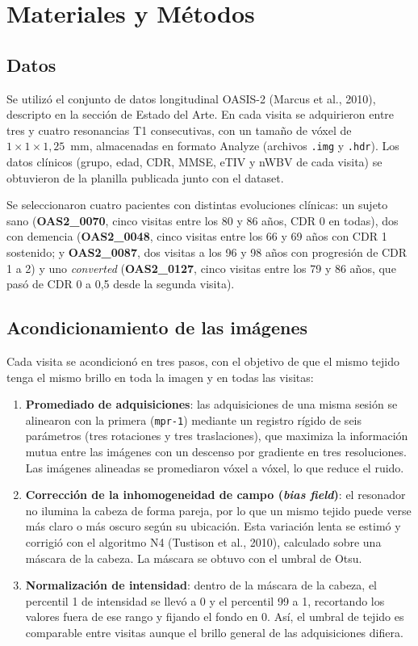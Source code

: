 \documentclass[10pt]{article}
\begin{document}
\section{Materiales y Métodos}
\subsection{Datos}
 
Se utilizó el conjunto de datos longitudinal OASIS-2 (Marcus et al., 2010), descripto en la sección de Estado del Arte. En cada visita se adquirieron entre tres y cuatro resonancias T1 consecutivas, con un tamaño de vóxel de $1 \times 1 \times 1{,}25$~mm, almacenadas en formato Analyze (archivos \texttt{.img} y \texttt{.hdr}). Los datos clínicos (grupo, edad, CDR, MMSE, eTIV y nWBV de cada visita) se obtuvieron de la planilla publicada junto con el dataset.
 
Se seleccionaron cuatro pacientes con distintas evoluciones clínicas: un sujeto sano (\textbf{OAS2\_0070}, cinco visitas entre los 80 y 86 años, CDR 0 en todas), dos con demencia (\textbf{OAS2\_0048}, cinco visitas entre los 66 y 69 años con CDR 1 sostenido; y \textbf{OAS2\_0087}, dos visitas a los 96 y 98 años con progresión de CDR 1 a 2) y uno \textit{converted} (\textbf{OAS2\_0127}, cinco visitas entre los 79 y 86 años, que pasó de CDR 0 a 0,5 desde la segunda visita).

\subsection{Acondicionamiento de las imágenes}
 
Cada visita se acondicionó en tres pasos, con el objetivo de que el mismo tejido tenga el mismo brillo en toda la imagen y en todas las visitas:
 
\begin{enumerate}
    \item \textbf{Promediado de adquisiciones}: las adquisiciones de una misma sesión se alinearon con la primera (\texttt{mpr-1}) mediante un registro rígido de seis parámetros (tres rotaciones y tres traslaciones), que maximiza la información mutua entre las imágenes con un descenso por gradiente en tres resoluciones. Las imágenes alineadas se promediaron vóxel a vóxel, lo que reduce el ruido.
 
    \item \textbf{Corrección de la inhomogeneidad de campo (\textit{bias field})}: el resonador no ilumina la cabeza de forma pareja, por lo que un mismo tejido puede verse más claro o más oscuro según su ubicación. Esta variación lenta se estimó y corrigió con el algoritmo N4 (Tustison et al., 2010), calculado sobre una máscara de la cabeza. La máscara se obtuvo con el umbral de Otsu.
 
    \item \textbf{Normalización de intensidad}: dentro de la máscara de la cabeza, el percentil 1 de intensidad se llevó a 0 y el percentil 99 a 1, recortando los valores fuera de ese rango y fijando el fondo en 0. Así, el umbral de tejido es comparable entre visitas aunque el brillo general de las adquisiciones difiera.
\end{enumerate}
 
\end{document}
